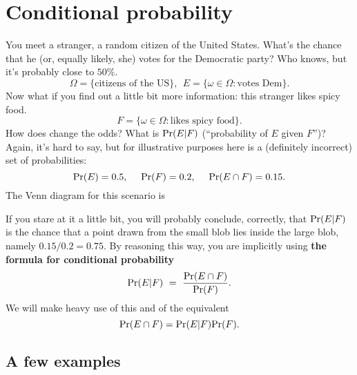 \section{Conditional probability}

You meet a stranger, a random citizen of the United States. What's the chance that he (or, equally likely, she) votes for the Democratic party? Who knows, but it's probably close to $50\%$.
$$ \Omega = \{\mbox{citizens of the US}\}, \ \ E = \{\omega \in \Omega: \mbox{votes Dem}\}.$$
Now what if you find out a little bit more information: this stranger likes spicy food.
$$ F = \{\omega \in \Omega: \mbox{likes spicy food}\}.$$
How does change the odds? What is $\mbox{\rm Pr}(E|F)$ (``probability of $E$ given $F$'')? Again, it's hard to say, but for illustrative purposes here is a (definitely incorrect) set of probabilities:
$$ \mbox{\rm Pr}(E) = 0.5, \ \ \ \ \mbox{\rm Pr}(F) = 0.2, \ \ \ \ \mbox{\rm Pr}(E \cap F) = 0.15.$$
The Venn diagram for this scenario is

\begin{center}
\end{center}

\noindent
If you stare at it a little bit, you will probably conclude, correctly, that $\mbox{\rm Pr}(E|F)$ is the chance that a point drawn from the small blob lies inside the large blob, namely $0.15/0.2 = 0.75$. By reasoning this way, you are implicitly using {\bf the formula for conditional probability}
$$ \mbox{\rm Pr}(E|F) \ = \ \frac{\mbox{\rm Pr}(E \cap F)}{\mbox{\rm Pr}(F)} .$$
We will make heavy use of this and of the equivalent
$$ \mbox{\rm Pr}(E \cap F) = \mbox{\rm Pr}(E|F) \mbox{\rm Pr}(F).$$

\subsection{A few examples}

